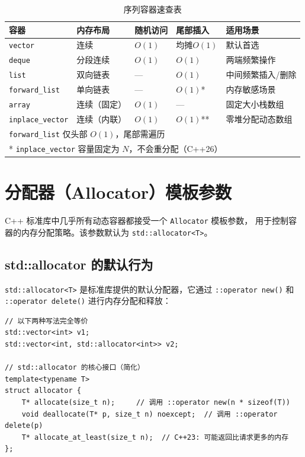 \documentclass[12pt,a4paper,fontset=fandol]{ctexbook}
\newcommand{\Fn}[1]{\texttt{#1()}}
\newcommand{\Tp}[1]{\texttt{#1}}
\begin{document}
\begin{table}[htbp]
\centering
\caption{序列容器速查表}
\label{tab:seq-overview}
\begin{tabularx}{\textwidth}{l l l l X}
\toprule
\textbf{容器} & \textbf{内存布局} & \textbf{随机访问} & \textbf{尾部插入} & \textbf{适用场景} \\
\midrule
\Tp{vector}      & 连续 & $O(1)$ & 均摊$O(1)$ & 默认首选 \\
\Tp{deque}       & 分段连续 & $O(1)$ & $O(1)$ & 两端频繁操作 \\
\Tp{list}        & 双向链表 & --- & $O(1)$ & 中间频繁插入/删除 \\
\Tp{forward\_list} & 单向链表 & --- & $O(1)$* & 内存敏感场景 \\
\Tp{array}       & 连续（固定） & $O(1)$ & --- & 固定大小栈数组 \\
\Tp{inplace\_vector} & 连续（内联） & $O(1)$ & $O(1)$** & 零堆分配动态数组 \\
\bottomrule
\multicolumn{5}{l}{\small * \Tp{forward\_list} 仅头部 $O(1)$，尾部需遍历} \\
\multicolumn{5}{l}{\small ** \Tp{inplace\_vector} 容量固定为 $N$，不会重分配（C++26）}
\end{tabularx}
\end{table}

\section{分配器（Allocator）模板参数}

C++ 标准库中几乎所有动态容器都接受一个 \texttt{Allocator} 模板参数，
用于控制容器的内存分配策略。该参数默认为 \Tp{std::allocator<T>}。

\subsection{std::allocator 的默认行为}

\Tp{std::allocator<T>} 是标准库提供的默认分配器，它通过 \Fn{::operator new}
和 \Fn{::operator delete} 进行内存分配和释放：

\begin{lstlisting}
// 以下两种写法完全等价
std::vector<int> v1;
std::vector<int, std::allocator<int>> v2;

// std::allocator 的核心接口（简化）
template<typename T>
struct allocator {
    T* allocate(size_t n);     // 调用 ::operator new(n * sizeof(T))
    void deallocate(T* p, size_t n) noexcept;  // 调用 ::operator delete(p)
    T* allocate_at_least(size_t n);  // C++23: 可能返回比请求更多的内存
};
\end{lstlisting}
\end{document}
